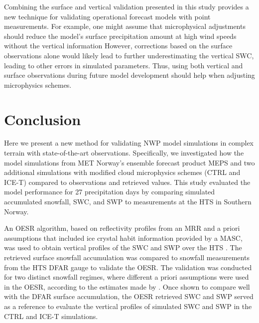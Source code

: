 \documentclass{ametsocV5}
\begin{document}
		Combining the surface and vertical validation presented in this study provides a new technique for validating operational forecast models with point measurements. For example, one might assume that microphysical adjustments should reduce the model's surface precipitation amount at high wind speeds without the vertical information However, corrections based on the surface observations alone would likely lead to further underestimating the vertical SWC, leading to other errors in simulated parameters. Thus, using both vertical and surface observations during future model development should help when adjusting microphysics schemes. 
		


\section{Conclusion}\label{sec:conclusion}
	Here we present a new method for validating NWP model simulations in complex terrain with state-of-the-art observations. Specifically, we investigated how the model simulations from MET Norway's ensemble forecast product MEPS and two additional simulations with modified cloud microphysics schemes (CTRL and ICE-T) compared to observations and retrieved values. This study evaluated the model performance for 27 precipitation days by comparing simulated accumulated snowfall, SWC, and SWP to measurements at the HTS in Southern Norway. 

	An OESR algorithm, based on reflectivity profiles from an MRR and a priori assumptions that included ice crystal habit information provided by a MASC, was used to obtain vertical profiles of the SWC and SWP over the HTS \citep{schirle_estimation_2019}. The retrieved surface snowfall accumulation was compared to snowfall measurements from the HTS DFAR gauge to validate the OESR. The validation was conducted for two distinct snowfall regimes, where different a priori assumptions were used in the OESR, according to the estimates made by \citet{schirle_estimation_2019}. Once shown to compare well with the DFAR surface accumulation, the OESR retrieved SWC and SWP served as a reference to evaluate the vertical profiles of simulated SWC and SWP in the CTRL and ICE-T simulations.
\end{document}
